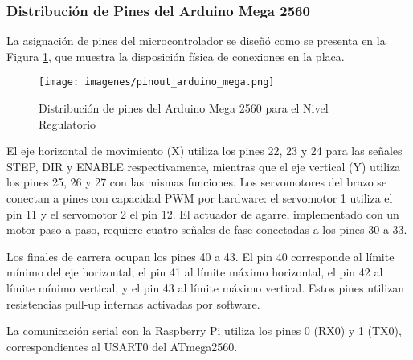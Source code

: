 \subsubsection{Distribución de Pines del Arduino Mega 2560}

La asignación de pines del microcontrolador se diseñó como se presenta en la Figura \ref{fig:pinout_arduino_mega}, que muestra la disposición física de conexiones en la placa.

\begin{figure}[H]
    \centering
    \texttt{[image: imagenes/pinout\_arduino\_mega.png]}
    \caption{Distribución de pines del Arduino Mega 2560 para el Nivel Regulatorio}
    \label{fig:pinout_arduino_mega}
\end{figure}

El eje horizontal de movimiento (X) utiliza los pines 22, 23 y 24 para las señales STEP, DIR y ENABLE respectivamente, mientras que el eje vertical (Y) utiliza los pines 25, 26 y 27 con las mismas funciones. Los servomotores del brazo se conectan a pines con capacidad PWM por hardware: el servomotor 1 utiliza el pin 11 y el servomotor 2 el pin 12. El actuador de agarre, implementado con un motor paso a paso, requiere cuatro señales de fase conectadas a los pines 30 a 33.

Los finales de carrera ocupan los pines 40 a 43. El pin 40 corresponde al límite mínimo del eje horizontal, el pin 41 al límite máximo horizontal, el pin 42 al límite mínimo vertical, y el pin 43 al límite máximo vertical. Estos pines utilizan resistencias pull-up internas activadas por software.

La comunicación serial con la Raspberry Pi utiliza los pines 0 (RX0) y 1 (TX0), correspondientes al USART0 del ATmega2560.